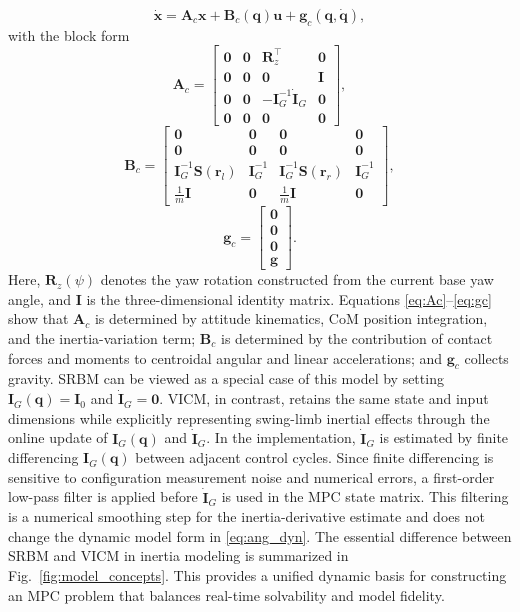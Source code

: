 \documentclass[5p,times]{elsarticle}
\begin{document}
\begin{equation}
\dot{\bm x}=\bm A_c\bm x+\bm B_c(\bm q)\bm u+\bm g_c(\bm q,\dot{\bm q}),
\label{eq:affine}
\end{equation}
with the block form
\begin{equation}
\bm A_c=
\begin{bmatrix}
\bm 0 & \bm 0 & \bm R_z^\top & \bm 0\\
\bm 0 & \bm 0 & \bm 0 & \bm I\\
\bm 0 & \bm 0 & -\bm I_G^{-1}\dot{\bm I}_G & \bm 0\\
\bm 0 & \bm 0 & \bm 0 & \bm 0
\end{bmatrix},
\label{eq:Ac}
\end{equation}
\begin{equation}
\bm B_c=
\begin{bmatrix}
\bm 0 & \bm 0 & \bm 0 & \bm 0\\
\bm 0 & \bm 0 & \bm 0 & \bm 0\\
\bm I_G^{-1}\bm S(\bm r_l) & \bm I_G^{-1} & \bm I_G^{-1}\bm S(\bm r_r) & \bm I_G^{-1}\\
\frac{1}{m}\bm I & \bm 0 & \frac{1}{m}\bm I & \bm 0
\end{bmatrix},
\label{eq:Bc}
\end{equation}
\begin{equation}
\bm g_c=
\begin{bmatrix}
\bm 0\\ \bm 0\\ \bm 0\\ \bm g
\end{bmatrix}.
\label{eq:gc}
\end{equation}
Here, $\bm R_z(\psi)$ denotes the yaw rotation constructed from the current base yaw angle, and $\bm I$ is the three-dimensional identity matrix. Equations \eqref{eq:Ac}--\eqref{eq:gc} show that $\bm A_c$ is determined by attitude kinematics, CoM position integration, and the inertia-variation term; $\bm B_c$ is determined by the contribution of contact forces and moments to centroidal angular and linear accelerations; and $\bm g_c$ collects gravity. SRBM can be viewed as a special case of this model by setting $\bm I_G(\bm q)=\bm I_0$ and $\dot{\bm I}_G=\bm 0$. VICM, in contrast, retains the same state and input dimensions while explicitly representing swing-limb inertial effects through the online update of $\bm I_G(\bm q)$ and $\dot{\bm I}_G$. In the implementation, $\dot{\bm I}_G$ is estimated by finite differencing $\bm I_G(\bm q)$ between adjacent control cycles. Since finite differencing is sensitive to configuration measurement noise and numerical errors, a first-order low-pass filter is applied before $\dot{\bm I}_G$ is used in the MPC state matrix. This filtering is a numerical smoothing step for the inertia-derivative estimate and does not change the dynamic model form in \eqref{eq:ang_dyn}. The essential difference between SRBM and VICM in inertia modeling is summarized in Fig.~\ref{fig:model_concepts}. This provides a unified dynamic basis for constructing an MPC problem that balances real-time solvability and model fidelity.
\end{document}

